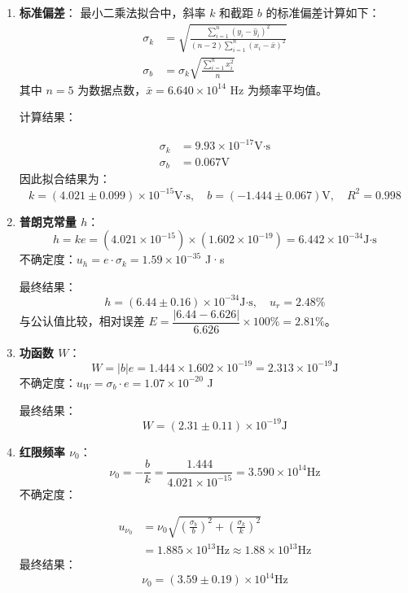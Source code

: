 \documentclass[10pt,a4paper]{ctexart}
\newcommand{\myspace}[1]{\par\vspace{#1\baselineskip}} %
\begin{document}
\begin{enumerate}
    \item \textbf{标准偏差}：
    最小二乘法拟合中，斜率 $k$ 和截距 $b$ 的标准偏差计算如下：
    \begin{align*}
    \sigma_k &= \sqrt{\frac{\sum_{i=1}^n (y_i - \hat{y}_i)^2}{(n-2) \sum_{i=1}^n (x_i - \bar{x})^2}} \\
    \sigma_b &= \sigma_k \sqrt{\frac{\sum_{i=1}^n x_i^2}{n}}
    \end{align*}
    其中 $n=5$ 为数据点数，$\bar{x} = 6.640 \times 10^{14}$ Hz 为频率平均值。
    
    计算结果：
    
\begin{align*}
    \sigma_k &= 9.93 \times 10^{-17}  \text{V·s} \\
    \sigma_b &= 0.067  \text{V}
    \end{align*}
    因此拟合结果为：
    $$     k = (4.021 \pm 0.099) \times 10^{-15}  \text{V·s}, \quad b = (-1.444 \pm 0.067)  \text{V}, \quad R^2 = 0.998     $$
    
    \item \textbf{普朗克常量 $h$}：
    $$     h = k e = (4.021 \times 10^{-15}) \times (1.602 \times 10^{-19}) = 6.442 \times 10^{-34}  \text{J·s}     $$
    不确定度：$u_h = e \cdot \sigma_k = 1.59 \times 10^{-35}$ J·s
    
    最终结果：
    $$     h = (6.44 \pm 0.16) \times 10^{-34}  \text{J·s}, \quad u_r = 2.48\%     $$
    与公认值比较，相对误差 $E = \dfrac{|6.44 - 6.626|}{6.626} \times 100\% = 2.81\%$。
    
    \item \textbf{功函数 $W$}：
    $$     W = |b| e = 1.444 \times 1.602 \times 10^{-19} = 2.313 \times 10^{-19}  \text{J}     $$
    不确定度：$u_W = \sigma_b \cdot e = 1.07 \times 10^{-20}$ J
    
    最终结果：
    $$     W = (2.31 \pm 0.11) \times 10^{-19}  \text{J}     $$
    
    \item \textbf{红限频率 $\nu_0$}：
    $$     \nu_0 = -\frac{b}{k} = \frac{1.444}{4.021 \times 10^{-15}} = 3.590 \times 10^{14}  \text{Hz}     $$
    不确定度：
    
\begin{align*}
    u_{\nu_0} &= \nu_0 \sqrt{ \left( \frac{\sigma_b}{b} \right)^2 + \left( \frac{\sigma_k}{k} \right)^2 } \\
    &= 1.885 \times 10^{13}  \text{Hz} \approx 1.88 \times 10^{13}  \text{Hz}
    \end{align*}
    最终结果：
    $$     \nu_0 = (3.59 \pm 0.19) \times 10^{14}  \text{Hz}     $$
\end{enumerate}
\myspace{2}
\end{document}
